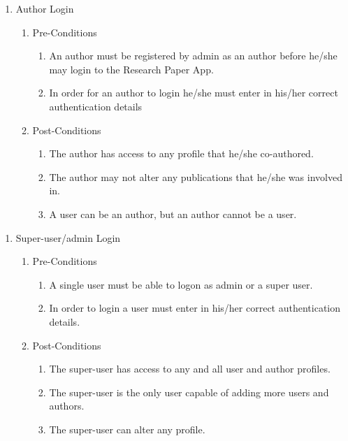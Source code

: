 \documentclass[hidelinks,a4paper,12pt]{article}
\begin{document}
	\begin{enumerate}
		\item  Author Login
		
		\begin{enumerate}
			\item  Pre-Conditions
			
			\begin{enumerate}
				\item  An author must be registered by admin as an author before he/she may login to the Research Paper App.
				
				\item  In order for an author to login he/she must enter in his/her correct authentication details
			\end{enumerate}
			
			\item  Post-Conditions
			
			\begin{enumerate}
				\item  The author has access to any profile that he/she co-authored.
				
				\item  The author may not alter any publications that he/she was involved in.
				
				\item  A user can be an author, but an author cannot be a user.
			\end{enumerate}
		\end{enumerate}
	\end{enumerate}
	
	\noindent  
	
	\begin{enumerate}
		\item  Super-user/admin Login
		
		\begin{enumerate}
			\item  Pre-Conditions
			
			\begin{enumerate}
				\item  A single user must be able to logon as admin or a super user.
				
				\item  In order to login a user must enter in his/her correct authentication details.
			\end{enumerate}
			
			\item  Post-Conditions
			
			\begin{enumerate}
				\item  The super-user has access to any and all user and author profiles.
				
				\item  The super-user is the only user capable of adding more users and authors.
				
				\item  The super-user can alter any profile.
			\end{enumerate}
		\end{enumerate}
	\end{enumerate}
	
\end{document}
